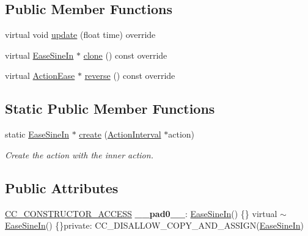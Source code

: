 \subsection*{Public Member Functions}
\begin{DoxyCompactItemize}
\item 
virtual void \hyperlink{classEaseSineIn_aa409768eb74f38a9c8c7346f9c5243e1}{update} (float time) override
\item 
virtual \hyperlink{classEaseSineIn}{Ease\+Sine\+In} $\ast$ \hyperlink{classEaseSineIn_a140c6fd97ab8a7d381fe5eebca3c4719}{clone} () const override
\item 
virtual \hyperlink{classActionEase}{Action\+Ease} $\ast$ \hyperlink{classEaseSineIn_a1de9aa9234921476d8cbfa1a3f555c29}{reverse} () const override
\end{DoxyCompactItemize}
\subsection*{Static Public Member Functions}
\begin{DoxyCompactItemize}
\item 
static \hyperlink{classEaseSineIn}{Ease\+Sine\+In} $\ast$ \hyperlink{classEaseSineIn_a7598abdd5ad4b83e9e67e0ff18401ddc}{create} (\hyperlink{classActionInterval}{Action\+Interval} $\ast$action)
\begin{DoxyCompactList}\small\item\em Create the action with the inner action. \end{DoxyCompactList}\end{DoxyCompactItemize}
\subsection*{Public Attributes}
\begin{DoxyCompactItemize}
\item 
\mbox{\label{classEaseSineIn_a330f0994383238f95a4107ab2541136d}} 
\hyperlink{_2cocos2d_2cocos_2base_2ccConfig_8h_a25ef1314f97c35a2ed3d029b0ead6da0}{C\+C\+\_\+\+C\+O\+N\+S\+T\+R\+U\+C\+T\+O\+R\+\_\+\+A\+C\+C\+E\+SS} {\bfseries \+\_\+\+\_\+pad0\+\_\+\+\_\+}\+: \hyperlink{classEaseSineIn}{Ease\+Sine\+In}() \{\} virtual $\sim$\hyperlink{classEaseSineIn}{Ease\+Sine\+In}() \{\}private\+: C\+C\+\_\+\+D\+I\+S\+A\+L\+L\+O\+W\+\_\+\+C\+O\+P\+Y\+\_\+\+A\+N\+D\+\_\+\+A\+S\+S\+I\+GN(\hyperlink{classEaseSineIn}{Ease\+Sine\+In})
\end{DoxyCompactItemize}
